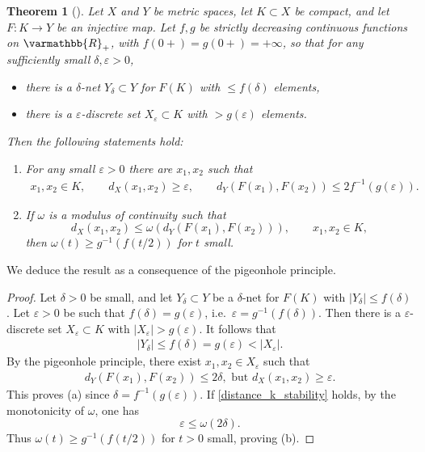 \documentclass[12pt,twoside]{amsart}
\numberwithin{equation}{section}
\renewcommand{\leq}{\leqslant}
\renewcommand{\geq}{\geqslant}
\renewcommand{\mathbb}{\varmathbb}
\newtheorem{theorem}{Theorem}[section]
\newcommand{\mR}{\mathbb{R}}                    %
\newcommand{\abs}[1]{\lvert #1 \rvert}          %
\newcommand{\eps}{\varepsilon}
\begin{document}
\begin{theorem}[\cite{Mandache}]
\label{thm:Mandache}
Let $X$ and $Y$ be metric spaces, let $K \subset X$ be compact, and let $F: K \rightarrow Y$ be an injective map. Let $f, g$ be strictly decreasing continuous functions on $\mR_+$, with $f(0+) = g(0+) = +\infty$, so that for any sufficiently small $\delta, \eps > 0$, 
\begin{itemize}
\item[(i)] there is a $\delta$-net $Y_{\delta}\subset Y$ for $F(K)$ with $\leq f(\delta)$ elements,
\item[(ii)] there is a $\eps$-discrete set $X_{\eps} \subset K$ with $> g(\eps)$ elements.
\end{itemize}
Then the following statements hold:
\begin{enumerate}
\item[(a)]
For any small $\eps > 0$ there are $x_1, x_2$ such that 
\begin{align}
\label{eq:elements}
x_1, x_2 \in K, \qquad d_X(x_1, x_2) \geq \eps, \qquad d_Y(F(x_1), F(x_2)) \leq 2 f^{-1}(g(\eps)).
\end{align}
\item[(b)]
If $\omega$ is a modulus of continuity such that 
\begin{equation} \label{distance_k_stability}
d_X(x_1, x_2) \leq \omega(d_Y(F(x_1), F(x_2))), \qquad x_1, x_2 \in K,
\end{equation}
then 
$\omega(t) \geq g^{-1}(f(t/2))$ for $t$ small.
\end{enumerate}
\end{theorem}





We deduce the result as a consequence of the pigeonhole principle.

\begin{proof}
Let $\delta > 0$ be small, and let $Y_{\delta}\subset Y$ be a $\delta$-net for $F(K)$ with $\abs{Y_{\delta}} \leq f(\delta)$. Let $\eps > 0$ be such that $f(\delta) = g(\eps)$, i.e.\ $\eps = g^{-1}(f(\delta))$. Then there is a $\eps$-discrete set $X_{\eps} \subset K$ with $\abs{X_{\eps}} > g(\eps)$. It follows that 
\begin{align}
\label{eq:pidgeon}
\abs{Y_{\delta}} \leq f(\delta) = g(\eps) < \abs{X_{\eps}}.
\end{align}
By the pigeonhole principle, there exist $x_1, x_2 \in X_{\eps}$ such that 
\begin{align*}
d_Y(F(x_1), F(x_2)) \leq 2 \delta, \mbox{ but } d_X(x_1, x_2) \geq \eps.
\end{align*} 
This proves (a) since $\delta = f^{-1}(g(\eps))$. If \eqref{distance_k_stability} holds, by the monotonicity of $\omega$, one has 
\[
\eps \leq \omega(2\delta).
\]
Thus $\omega(t) \geq g^{-1}(f(t/2))$ for $t > 0$ small, proving (b).
\end{proof}
\end{document}

